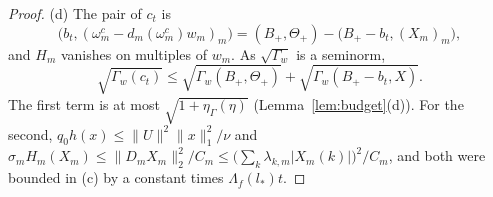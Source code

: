 \begin{proof}
(d) The pair of $c_t$ is
\[
 \big(b_t,(\omega^c_m-d_m(\omega^c_m)w_m)_m\big)=(B_+,\Theta_+)-\big(B_+-b_t,
 (X_m)_m\big),
\]
and $H_m$ vanishes on multiples of $w_m$.  As $\sqrt{\Gamma_w}$ is a
seminorm,
\[
 \sqrt{\Gamma_w(c_t)}\le\sqrt{\Gamma_w(B_+,\Theta_+)}+\sqrt{\Gamma_w(B_+-
 b_t,X)}.
\]  The first term is at most
$\sqrt{1+\eta_\Gamma(\eta)}$ (Lemma~\ref{lem:budget}(d)).  For the second,
$q_0h(x)\le\|U\|^2\|x\|_1^2/\nu$ and
$\sigma_mH_m(X_m)\le\|D_mX_m\|_2^2/C_m\le\big(\sum_k\lambda_{k,m}|X_m(k)|
\big)^2/C_m$, and both were bounded in (c) by a
constant times $\Lambda_f(l_*)t$.
\end{proof}
